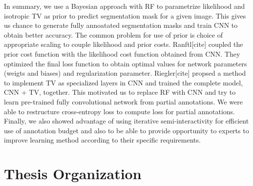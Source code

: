 In summary, we use a Bayesian approach with RF to parametrize likelihood and isotropic TV as prior to predict segmentation mask for a given image. This gives us chance to generate fully annoatated segmentation masks and train CNN to obtain better accuracy. The common problem for use of prior is choice of appropriate scaling to couple likelihood and prior costs. Ranftl[cite] coupled the prior cost function with the likelihood cost function obtained from CNN. They optimized the final loss function to obtain optimal values for network parameters (weigts and biases) and regularization parameter. Riegler[cite] propsed a method to implement TV as specialized layers in CNN and trained the complete model, CNN + TV, together. This motivated us to replace RF with CNN and try to learn pre-trained fully convolutional network from partial annotations. We were able to restructure cross-entropy loss to compute loss for partial annotations. \newline
Finally, we also showed advantage of using iterative semi-interactivity for efficient use of annotation budget and also to be able to provide opportunity to experts to improve learning method according to their specific requirements.

\section{Thesis Organization}



